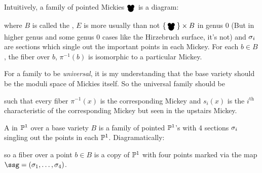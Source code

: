 \documentclass[12pt]{memoir}
\newcommand{\Mickey}{\pre{\raisebox{-1mm}{\scalebox{1.3}{\ensuremath\bullet}}}\hspace{-1.8 mm}{\raisebox{-1.65mm}{\scalebox{2.1}{\ensuremath\bullet}}}^{\hspace{-2.1mm}\raisebox{-1mm}{\scalebox{1.3}{\ensuremath\bullet}}}}
\newcommand{\Submickey}{\pre{\scalebox{0.75}{\ensuremath\bullet}}\hspace{-0.9mm}{\raisebox{-0.35mm}{\scalebox{1.1}{\ensuremath\bullet}}}^{\hspace{-1.1mm}\raisebox{-0.1mm}{\scalebox{0.75}{\ensuremath\bullet}}}}
\begin{document}
Intuitively, a family of pointed Mickies $\Mickey$ is a diagram:
\begin{figure}[h!]
    \centering
{}
    \label{fig-example-family-diagram}
\end{figure}
where $B$ is called the , $E$ is more usually than not $\set{\Mickey}\x B$ in genus 0 (But in higher genus and some genus 0 cases like the Hirzebruch surface, it's not) and $\sigma_i$ are sections which single out the important points in each Mickey. For each $b\in B$, the fiber over $b$, $\pi^{-1}(b)$ is isomorphic to a particular Mickey.\par 
For a family to be \emph{universal}, it is my understanding that the base variety should be the moduli space of Mickies itself. So the universal family should be 

\begin{figure}[h!]
    \centering
{}
    \label{fig-example-universal-family-diagram}
\end{figure}

such that every fiber $\pi^{-1}(x)$ is the corresponding Mickey and $s_i(x)$ is the $i^{\text{th}}$ characteristic of the corresponding Mickey but seen in the upstairs Mickey.

\begin{Def}
    A  in $\mathbb{P}^1$ over a base variety $B$ is a family of pointed $\mathbb{P}^1$'s with 4 sections $\sigma_i$ singling out the points in each $\mathbb{P}^1$. Diagramatically: 
    \begin{center}
    \end{center}
    so a fiber over a point $b\in B$ is a copy of $\mathbb{P}^1$ with four points marked via the map $\ssg=(\sg_1,\dots,\sg_4)$.
\end{Def}
\end{document}
